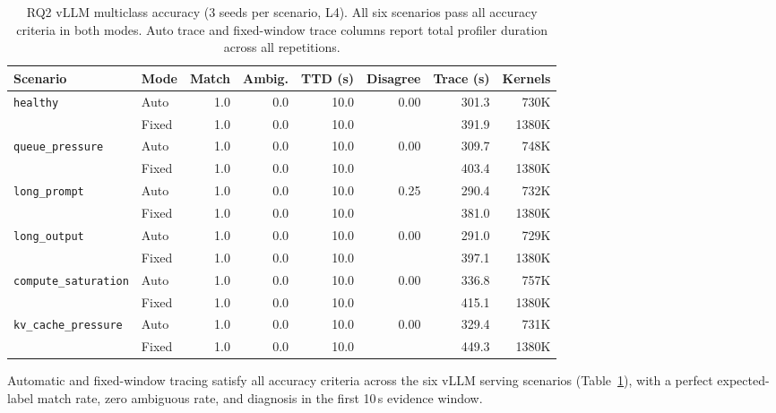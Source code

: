 \begin{table}[t]
\centering
\caption{RQ2 vLLM multiclass accuracy (3 seeds per scenario, L4). All six scenarios pass
all accuracy criteria in both modes. Auto trace and fixed-window trace columns report total
profiler duration across all repetitions.}
\label{tab:rq2-vllm}
\footnotesize
\setlength{\tabcolsep}{4pt}
\renewcommand{\arraystretch}{0.95}
\begin{tabular}{llrrrrrr}
\toprule
\textbf{Scenario} & \textbf{Mode} & \textbf{Match} & \textbf{Ambig.} &
\textbf{TTD (s)} & \textbf{Disagree} & \textbf{Trace (s)} & \textbf{Kernels} \\
\midrule
\texttt{healthy}
  & Auto  & 1.0 & 0.0 & 10.0 & \multirow{2}{*}{0.00} & 301.3 & 730K \\
  & Fixed & 1.0 & 0.0 & 10.0 &                        & 391.9 & 1380K \\
\midrule
\texttt{queue\_pressure}
  & Auto  & 1.0 & 0.0 & 10.0 & \multirow{2}{*}{0.00} & 309.7 & 748K \\
  & Fixed & 1.0 & 0.0 & 10.0 &                        & 403.4 & 1380K \\
\midrule
\texttt{long\_prompt}
  & Auto  & 1.0 & 0.0 & 10.0 & \multirow{2}{*}{0.25} & 290.4 & 732K \\
  & Fixed & 1.0 & 0.0 & 10.0 &                        & 381.0 & 1380K \\
\midrule
\texttt{long\_output}
  & Auto  & 1.0 & 0.0 & 10.0 & \multirow{2}{*}{0.00} & 291.0 & 729K \\
  & Fixed & 1.0 & 0.0 & 10.0 &                        & 397.1 & 1380K \\
\midrule
\texttt{compute\_saturation}
  & Auto  & 1.0 & 0.0 & 10.0 & \multirow{2}{*}{0.00} & 336.8 & 757K \\
  & Fixed & 1.0 & 0.0 & 10.0 &                        & 415.1 & 1380K \\
\midrule
\texttt{kv\_cache\_pressure}
  & Auto  & 1.0 & 0.0 & 10.0 & \multirow{2}{*}{0.00} & 329.4 & 731K \\
  & Fixed & 1.0 & 0.0 & 10.0 &                        & 449.3 & 1380K \\
\bottomrule
\end{tabular}
\end{table}

Automatic and fixed-window tracing satisfy all accuracy criteria across the six vLLM serving scenarios (Table~\ref{tab:rq2-vllm}), with a perfect expected-label match rate, zero ambiguous rate, and diagnosis in the first 10\,s evidence window.

